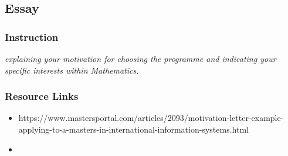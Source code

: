 \subsection*{Essay}\label{sec:essay}

\subsubsection*{Instruction}
\textit{explaining your motivation for choosing the programme and indicating your specific interests within Mathematics.}

\subsubsection*{Resource Links}
\begin{itemize}
    \item https://www.mastersportal.com/articles/2093/motivation-letter-example-applying-to-a-masters-in-international-information-systems.html
    \item 
\end{itemize}

